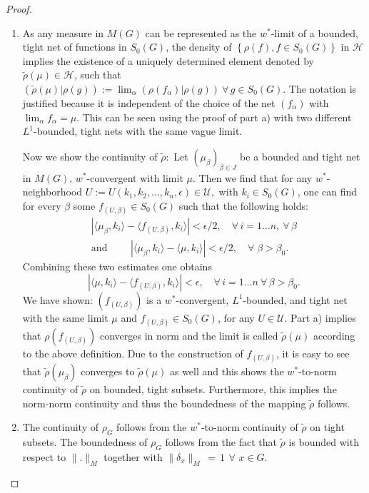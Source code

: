 \documentclass[10pt,a4paper]{amsart}
\begin{document}
\begin{proof}
\begin{enumerate}
\item[(b)] As any measure in $M(G)$ can be represented as the
$w^*$-limit of a bounded, tight net of functions in $S_0(G)$,
the density  of
$\left\{  \rho (f) , f \in {S_{0}(G)} \right\} $
in $\mathcal{H}$ implies the existence of a uniquely
determined element denoted by
$\tilde{\rho}(\mu ) \in  \mathcal{H}$,
such that $(\tilde{\rho}(\mu )| \rho (g)) := \lim_{\alpha }(\rho
(f_{\alpha })| \rho (g))  \ \forall \,  g \in {S_{0}(G)}$. The notation is
justified because it is independent of the choice of the net
$(f_{\alpha })$ with $\lim_{\alpha} f_{\alpha} = \mu$.
This can be seen using the proof of part a)
with two different $L^1$-bounded, tight nets with the
same vague limit.

Now we show the continuity of $\tilde{\rho}:$
Let $(\mu _{\beta })_{\beta \in J}$  be a bounded and tight
net in $M(G),\,  w^\ast$-convergent  with  limit $\mu$.
Then we find that for any ${w}^*$-neighborhood
$  U := U(k_{1},k_{2},\ldots ,k_{n},\epsilon ) \in  \mathcal{U},$
 with $ k_{i} \in  {S_{0}(G)}  $, one can find for every $\beta$  some  $ f_{(U,\beta)} \in  {S_{0}(G)}$
such that the following holds:
\begin{gather*}
| \langle\mu _{\beta },k_{i}\rangle - \langle f_{(U,\beta)},k_{i}\rangle|
< \epsilon /2, \quad \forall \,  i=1\ldots n, \ \forall \, \beta\\
\text{and }\quad \quad | \langle\mu _{\beta },k_{i}\rangle - \langle\mu
,k_{i}\rangle|  < \epsilon /2,  \quad \forall \; \beta  > \beta _{0}.
\end{gather*}
Combining these two estimates one obtains
\[
| \langle \mu ,k_{i}\rangle - \langle
f_{(U,\beta)},k_{i}\rangle|  <  \epsilon,
 \quad \forall \,  i=1\ldots n \ \forall \,  \beta  > \beta _{0}.
\]
We have shown: $(f_{(U,\beta)})$ is a
$w^\ast$-convergent, $L^{1}$-bounded, and
tight net with the same limit
$\mu $ and $f_{(U,\beta)} \in {S_{0}(G)}$, for any
$U \in \mathcal{U}$.
Part a) implies that $\rho(f_{(U,\beta)})$ converges in
norm and
the limit is called $\tilde{\rho}(\mu )$ according to the above
definition.  Due to the construction of $f_{(U,\beta)}$, it is easy to
see that
$\tilde{\rho}(\mu _{\beta })$ converges to $\tilde{\rho}(\mu )$ as
well and this shows the ${w}^*$-to-norm continuity of $\tilde{\rho}$
on bounded, tight subsets. Furthermore, this implies the norm-norm
continuity and thus the boundedness of the mapping $\tilde{\rho}$
follows.

\item[(c)] The continuity of
$\rho _{G}$ follows from the ${w}^*$-to-norm continuity of
$\tilde{\rho}$ on tight subsets.
The boundedness of $\rho _{G}$ follows
from the fact that $\tilde{\rho}$ is bounded with respect to $\| .
\|_M$ together with
$\| \delta_x \|_M \,=\,1 \, \ \forall \, \, x \in G$.


\end{enumerate}
\end{proof}
\end{document}
